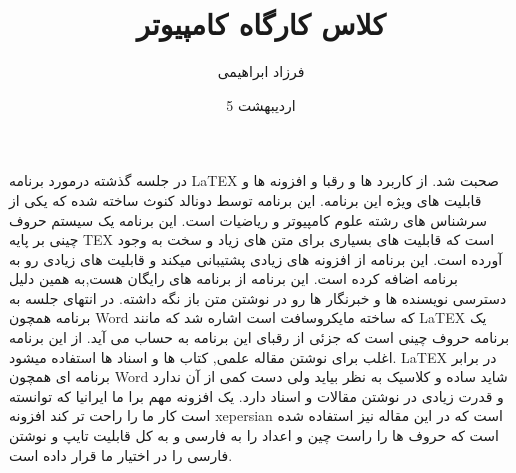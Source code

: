 \documentclass{article}
\title{کلاس کارگاه کامپیوتر}
\date{5 اردیبهشت}
\author{فرزاد ابراهیمی}
\begin{document}
\maketitle
در جلسه گذشته درمورد برنامه LaTEX صحبت شد. از کاربرد ها و رقبا و افزونه ها و قابلیت های ویژه این برنامه. این برنامه توسط دونالد کنوث ساخته شده که یکی از سرشناس های رشته علوم کامپیوتر و ریاضیات است. این برنامه یک سیستم حروف چینی بر پایه TEX است که قابلیت های بسیاری برای متن های زیاد و سخت به وجود آورده است. این برنامه از افزونه های زیادی پشتیبانی میکند و قابلیت های زیادی رو به برنامه اضافه کرده است. این برنامه از برنامه های رایگان هست,به همین دلیل دسترسی نویسنده ها و خبرنگار ها رو در نوشتن متن باز نگه داشته.
در انتهای جلسه به برنامه همچون Word که ساخته مایکروسافت است اشاره شد که مانند LaTEX یک برنامه حروف چینی است که جزئی از رقبای این برنامه به حساب می آید. از این برنامه اغلب برای نوشتن مقاله علمی, کتاب ها و اسناد ها استفاده میشود. LaTEX در برابر برنامه ای همچون Word شاید ساده و کلاسیک به نظر بیاید ولی دست کمی از آن ندارد و قدرت زیادی در نوشتن مقالات و اسناد دارد. یک افزونه مهم برا ما ایرانیا که توانسته است کار ما را راحت تر کند افزونه xepersian است که در این مقاله نیز استفاده شده است که حروف ها را راست چین و اعداد را به فارسی و به کل قابلیت تایپ و نوشتن فارسی را در اختیار ما قرار داده است.
\end{document}
